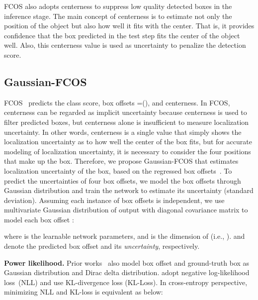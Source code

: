 \documentclass[final]{cvpr}
\begin{document}
FCOS also adopts centerness to suppress low quality detected boxes in the inference stage.
The main concept of centerness is to estimate not only the position of the object but also how well it fits with the center.
That is, it provides confidence that the box predicted in the test step fits the center of the object well.
Also, this centerness value is used as uncertainty to penalize the detection score.





\subsection{Gaussian-FCOS}
FCOS~\cite{Tian_2019_ICCV} predicts the class score, box offsets =(), and centerness. 
In FCOS, centerness can be regarded as implicit uncertainty because centerness is used to filter predicted boxes, but centerness alone is insufficient to measure localization uncertainty.
In other words, centerness is a single value that simply shows the localization uncertainty as to how well the center of the box fits, but for accurate modeling of localization uncertainty, it is necessary to consider the four positions that make up the box.
Therefore, we propose Gaussian-FCOS that estimates localization uncertainty of the box, based on the regressed box offsets~.
To predict the uncertainties of four box offsets, we model the box offsets through Gaussian distribution and train the network to estimate its uncertainty (standard deviation).
Assuming each instance of box offsets is independent, we use multivariate Gaussian distribution of output  with diagonal covariance matrix  to model each box offset :

where  is the learnable network parameters, and  is the dimension of  (i.e., ).
 and
 denote the predicted box offset and its \textit{uncertainty}, respectively.


\medskip

\noindent
\textbf{Power likelihood.}
Prior works~\cite{kraus2019uncertainty,le2018uncertainty,he2019bounding,choi2019gaussian} also model box offset and ground-truth box as Gaussian distribution and Dirac delta distribution.
\cite{kraus2019uncertainty,le2018uncertainty,choi2019gaussian} adopt negative log-likelihood loss~(NLL) and \cite{he2019bounding} use KL-divergence loss (KL-Loss).
In cross-entropy perspective, minimizing NLL and KL-loss is equivalent as below:
\end{document}
